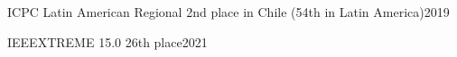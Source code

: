 \documentclass[../main.tex]{subfiles}
\begin{document}
ICPC Latin American Regional 2nd place in Chile (54th in Latin America)\hfill 2019\par
IEEEXTREME 15.0 26th place\hfill 2021\par
\end{document}
